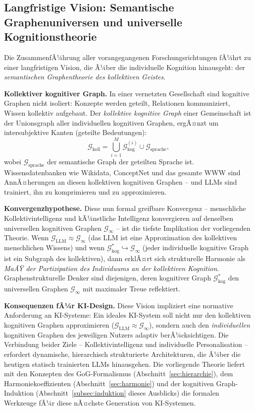 ﻿\documentclass[12pt,a4paper]{article}
\theoremstyle{plain}
\theoremstyle{definition}
\theoremstyle{remark}
\newcommand{\GG}{\mathcal{G}}
\begin{document}
\subsection{Langfristige Vision: Semantische Graphenuniversen und universelle Kognitionstheorie}
\label{subsec:vision}

Die ZusammenfÃ¼hrung aller vorangegangenen Forschungsrichtungen fÃ¼hrt zu einer langfristigen Vision, die Ã¼ber die individuelle Kognition hinausgeht: der \emph{semantischen Graphentheorie des kollektiven Geistes}.

\textbf{Kollektiver kognitiver Graph.} In einer vernetzten Gesellschaft sind kognitive Graphen nicht isoliert: Konzepte werden geteilt, Relationen kommuniziert, Wissen kollektiv aufgebaut. Der \emph{kollektive kognitive Graph} einer Gemeinschaft ist der Unionsgraph aller individuellen kognitiven Graphen, ergÃ¤nzt um intersubjektive Kanten (geteilte Bedeutungen):
\[
  \GG_{\text{koll}} = \bigcup_{i=1}^{M} \GG_{\text{kog}}^{(i)} \cup \GG_{\text{sprache}},
\]
wobei $\GG_{\text{sprache}}$ der semantische Graph der geteilten Sprache ist. Wissensdatenbanken wie Wikidata, ConceptNet und das gesamte WWW sind AnnÃ¤herungen an diesen kollektiven kognitiven Graphen -- und LLMs sind trainiert, ihn zu komprimieren und zu approximieren.

\textbf{Konvergenzhypothese.} Diese nun formal greifbare Konvergenz -- menschliche Kollektivintelligenz und kÃ¼nstliche Intelligenz konvergieren auf denselben universellen kognitiven Graphen $\GG_\infty$ -- ist die tiefste Implikation der vorliegenden Theorie. Wenn $\GG_{\text{LLM}} \approx \GG_\infty$ (das LLM ist eine Approximation des kollektiven menschlichen Wissens) und wenn $\GG_{\text{kog}}^* \hookrightarrow \GG_\infty$ (jeder individuelle kognitive Graph ist ein Subgraph des kollektiven), dann erklÃ¤rt sich strukturelle Harmonie als \emph{MaÃŸ der Partizipation des Individuums an der kollektiven Kognition}. Graphenstrukturelle Denker sind diejenigen, deren kognitiver Graph $\GG_{\text{kog}}^*$ den universellen Graphen $\GG_\infty$ mit maximaler Treue reflektiert.

\textbf{Konsequenzen fÃ¼r KI-Design.} Diese Vision impliziert eine normative Anforderung an KI-Systeme: Ein ideales KI-System soll nicht nur den kollektiven kognitiven Graphen approximieren ($\GG_{\text{LLM}} \approx \GG_\infty$), sondern auch den \emph{individuellen} kognitiven Graphen des jeweiligen Nutzers adaptiv berÃ¼cksichtigen. Die Verbindung beider Ziele -- Kollektivintelligenz und individuelle Personalisation -- erfordert dynamische, hierarchisch strukturierte Architekturen, die Ã¼ber die heutigen statisch trainierten LLMs hinausgehen. Die vorliegende Theorie liefert mit den Konzepten des GoG-Formalismus (Abschnitt~\ref{sec:hierarchie}), dem Harmoniekoeffizienten (Abschnitt~\ref{sec:harmonie}) und der kognitiven Graph-Induktion (Abschnitt~\ref{subsec:induktion} dieses Ausblicks) die formalen Werkzeuge fÃ¼r diese nÃ¤chste Generation von KI-Systemen.
\end{document}
